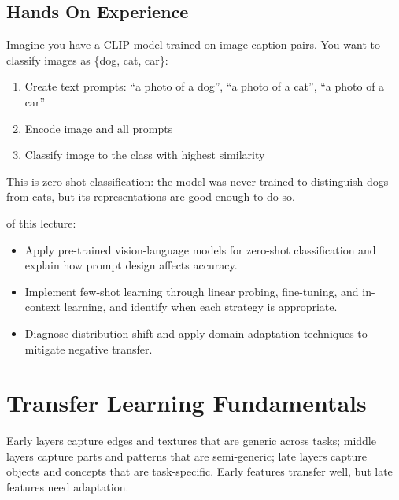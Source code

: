 \subsection{Hands On Experience}

Imagine you have a CLIP model trained on image-caption pairs. You want to classify images as \{dog, cat, car\}:

\begin{enumerate}
    \item Create text prompts: ``a photo of a dog'', ``a photo of a cat'', ``a photo of a car''
    \item Encode image and all prompts
    \item Classify image to the class with highest similarity
\end{enumerate}


This is zero-shot classification: the model was never trained to distinguish dogs from cats, but its representations are good enough to do so.

 of this lecture:
\begin{itemize}
    \item Apply pre-trained vision-language models for zero-shot classification and explain how prompt design affects accuracy.
    \item Implement few-shot learning through linear probing, fine-tuning, and in-context learning, and identify when each strategy is appropriate.
    \item Diagnose distribution shift and apply domain adaptation techniques to mitigate negative transfer.
\end{itemize}


\newpage
\section{Transfer Learning Fundamentals}


 Early layers capture edges and textures that are generic across tasks; middle layers capture parts and patterns that are semi-generic; late layers capture objects and concepts that are task-specific. Early features transfer well, but late features need adaptation.

